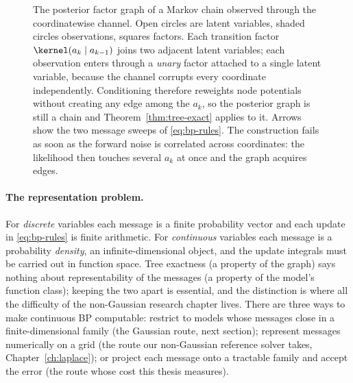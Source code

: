 \begin{figure}[t]\centering
{}
\caption[Posterior factor graph of a noised Markov chain]{The posterior factor
graph of a Markov chain observed through the coordinatewise channel. Open
circles are latent variables, shaded circles observations, squares factors. Each
transition factor $\kernel(a_k \mid a_{k-1})$ joins two adjacent latent
variables; each observation enters through a \emph{unary} factor attached to a
single latent variable, because the channel corrupts every coordinate
independently. Conditioning therefore reweights node potentials without creating
any edge among the $a_k$, so the posterior graph is still a chain and
Theorem~\ref{thm:tree-exact} applies to it. Arrows show the two message sweeps
of \eqref{eq:bp-rules}. The construction fails as soon as the forward noise is
correlated across coordinates: the likelihood then touches several $a_k$ at
once and the graph acquires edges.}
\label{fig:posterior-factor-graph}
\end{figure}

\paragraph{The representation problem.} For \emph{discrete} variables
each message is a finite probability vector and each update in
\eqref{eq:bp-rules} is finite arithmetic. For \emph{continuous} variables
each message is a probability \emph{density}, an infinite-dimensional
object, and the update integrals must be carried out in function space.
Tree exactness (a property of the graph) says nothing about
representability of the messages (a property of the model's function
class); keeping the two apart is essential, and the distinction is where
all the difficulty of the non-Gaussian research chapter lives. There are
three ways to make continuous BP computable: restrict to models whose
messages close in a finite-dimensional family (the Gaussian route, next
section); represent messages numerically on a grid (the route our
non-Gaussian reference solver takes, Chapter~\ref{ch:laplace}); or
project each message onto a tractable family and accept the error (the
route whose cost this thesis measures).


